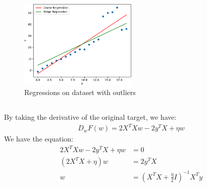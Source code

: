 \documentclass{article}
\begin{document}
\subsection{}
\begin{figure}[htbp]
    \begin{center}
        \includegraphics[width=0.5\textwidth]{./figure/ridge_regression_f2.pdf}
    \end{center}
    \caption{Regressions on dataset with outliers}\label{fig:}
\end{figure}
\subsection{}
By taking the derivative of the original target, we have:
\begin{align*}
    D_w F(w) = 2X^TXw - 2y^TX+\eta w
\end{align*}
We have the equation:
\begin{align*}
    2X^TXw - 2y^TX+\eta w &= 0\\
    (2X^TX +\eta) w &= 2y^TX\\
    w&= (X^TX+\frac{\eta}{2}I)^{-1}X^Ty
\end{align*}
\end{document}
